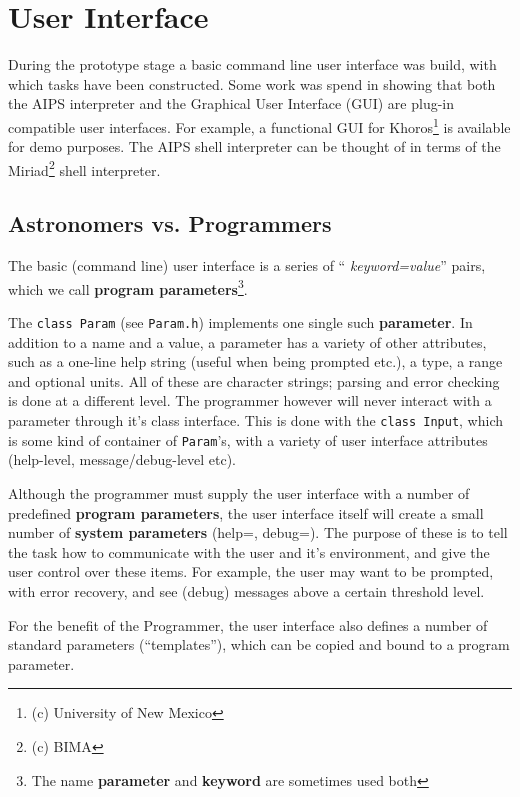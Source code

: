 
\chapter{User Interface}

During the prototype stage a basic command line user interface was
build, with which tasks have been constructed.  Some work was spend
in showing that both the AIPS interpreter and the Graphical User Interface
(GUI) are plug-in compatible user interfaces.  For example, a functional
GUI for Khoros\footnote{(c) University of New Mexico} is available for
demo purposes.  The AIPS shell interpreter can be thought of in terms of
the Miriad\footnote{(c) BIMA} shell interpreter. 


\section{Astronomers vs.  Programmers}

The basic (command line) user interface is a series of ``{\it
keyword=value}'' pairs, which we call {\bf program
parameters}\footnote{The name {\bf parameter} and {\bf keyword} are
sometimes used both}. 

The {\tt class Param} (see {\tt Param.h}) implements one single such
{\bf parameter}.  In addition to a name and a value, a parameter has a
variety of other attributes, such as a one-line help string (useful when
being prompted etc.), a type, a range and optional units.  All of these
are character strings; parsing and error checking is done at a different
level.  The programmer however will never interact with a parameter
through it's class interface.  This is done with the {\tt class Input},
which is some kind of container of {\tt Param}'s, with a variety of user
interface attributes (help-level, message/debug-level etc). 

Although the programmer must supply the user interface with a number of
predefined {\bf program parameters}, the user interface itself will
create a small number of {\bf system parameters} (help=, debug=).  The
purpose of these is to tell the task how to communicate with the user
and it's environment, and give the user control over these items.  For
example, the user may want to be prompted, with error recovery, and see 
(debug) messages above a certain threshold level. 

For the benefit of the Programmer, the user interface also defines a
number of standard parameters (``templates''), which can be copied and
bound to a program parameter.

